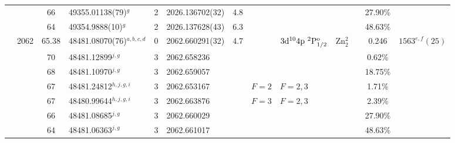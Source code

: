 \begin{table*}
\begin{center}
{\begin{tabular}{:l;l;c;l;c;l;c;l;l;c;c;c;c}
\rowstyle{\itshape}               &        & 66        & 49355.01138(79)$^{g}$            & 2 &   2026.136702(32)  &  4.8 & $                                        $ & $                                        $ &             &              & 27.90\%   & $     ^{}     $\\
\rowstyle{\itshape}               &        & 64        & 49354.9888(10)$^{g}$             & 2 &   2026.137628(43)  &  6.3 & $                                        $ & $                                        $ &             &              & 48.63\%   & $     ^{}     $\\
                                  & 2062   & 65.38     & 48481.08070(76)$^{a,b,c,d}$      & 0 &   2062.660291(32)  &  4.7 & $                                        $ & $3\rm{d}^{10}4\rm{p}~^2\rm{P}_{1/2}^{\rm o}$ & Zn$^2_{2}$  &              & 0.246     & $ 1563^{e,f}(25) $\\
\rowstyle{\itshape}               &        & 70        & 48481.12899$^{j,g}$              & 3 &   2062.658236      &      & $                                        $ & $                                        $ &             &              & 0.62\%    & $     ^{}     $\\
\rowstyle{\itshape}               &        & 68        & 48481.10970$^{j,g}$              & 3 &   2062.659057      &      & $                                        $ & $                                        $ &             &              & 18.75\%   & $     ^{}     $\\
\rowstyle{\itshape}               &        & 67        & 48481.24812$^{h,j,g,i}$          & 3 &   2062.653167      &      & $F=2                                     $ & $F=2,3                                   $ &             &              & 1.71\%    & $     ^{}     $\\
\rowstyle{\itshape}               &        & 67        & 48480.99644$^{h,j,g,i}$          & 3 &   2062.663876      &      & $F=3                                     $ & $F=2,3                                   $ &             &              & 2.39\%    & $     ^{}     $\\
\rowstyle{\itshape}               &        & 66        & 48481.08685$^{j,g}$              & 3 &   2062.660029      &      & $                                        $ & $                                        $ &             &              & 27.90\%   & $     ^{}     $\\
\rowstyle{\itshape}               &        & 64        & 48481.06363$^{j,g}$              & 3 &   2062.661017      &      & $                                        $ & $                                        $ &             &              & 48.63\%   & $     ^{}     $\\

\end{tabular}}
\end{center}
\end{table*}
